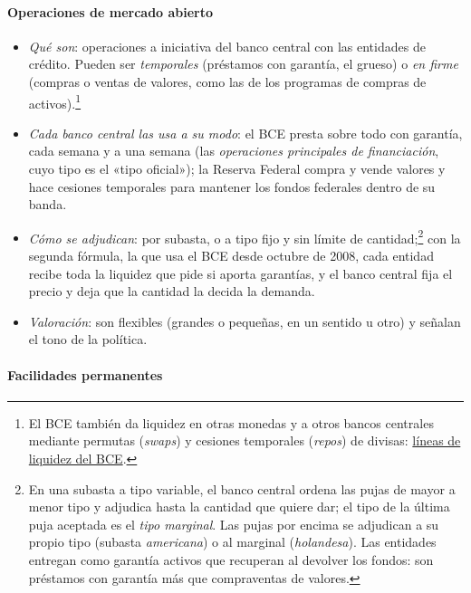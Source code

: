 \documentclass[11pt]{article}
\begin{document}
\paragraph{Operaciones de mercado abierto}

\begin{itemize}
\item \emph{Qué son}: operaciones a iniciativa del banco central con las entidades de crédito. Pueden ser \emph{temporales} (préstamos con garantía, el grueso) o \emph{en firme} (compras o ventas de valores, como las de los programas de compras de activos).\footnote{El BCE también da liquidez en otras monedas y a otros bancos centrales mediante permutas (\emph{swaps}) y cesiones temporales (\emph{repos}) de divisas: \href{https://www.ecb.europa.eu/mopo/liquidity-lines/swap-lines/html/index.es.html}{líneas de liquidez del BCE}.}
\item \emph{Cada banco central las usa a su modo}: el BCE presta sobre todo con garantía, cada semana y a una semana (las \emph{operaciones principales de financiación}, cuyo tipo es el «tipo oficial»); la Reserva Federal compra y vende valores y hace cesiones temporales para mantener los fondos federales dentro de su banda\nocite{Fed2019Amplias}.
\item \emph{Cómo se adjudican}: por subasta, o a tipo fijo y sin límite de cantidad;\footnote{En una subasta a tipo variable, el banco central ordena las pujas de mayor a menor tipo y adjudica hasta la cantidad que quiere dar; el tipo de la última puja aceptada es el \emph{tipo marginal}. Las pujas por encima se adjudican a su propio tipo (subasta \emph{americana}) o al marginal (\emph{holandesa}). Las entidades entregan como garantía activos que recuperan al devolver los fondos: son préstamos con garantía más que compraventas de valores.} con la segunda fórmula, la que usa el BCE desde octubre de 2008, cada entidad recibe toda la liquidez que pide si aporta garantías, y el banco central fija el precio y deja que la cantidad la decida la demanda.
\item \emph{Valoración}: son flexibles (grandes o pequeñas, en un sentido u otro) y señalan el tono de la política.
\end{itemize}

\paragraph{Facilidades permanentes}
\end{document}
